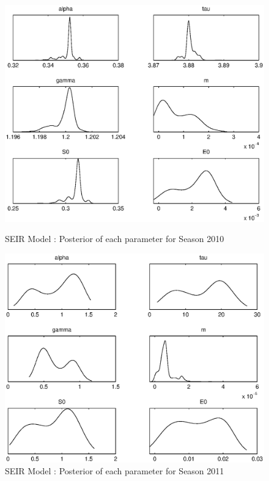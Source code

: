 \documentclass[11pt, a4paper]{article}
\begin{document}
\begin{figure}[H!]
\FloatBarrier
\centering
    \includegraphics[height = 0.25\textheight]{figures/SEIR_posterior_season1.eps}
    \caption{SEIR Model : Posterior of each parameter for Season 2010}
    \label{fig:seir_post1}
    \includegraphics[height = 0.25\textheight]{figures/SEIR_posterior_season2.eps}
    \caption{SEIR Model : Posterior of each parameter for Season 2011}
    \label{fig:seir_post2}

\end{figure}
\end{document}
